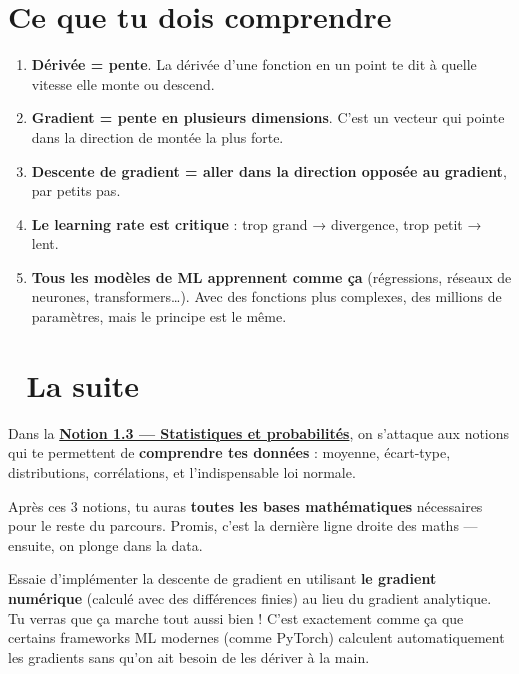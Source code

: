 \documentclass[
  french,
  11pt,
  a4paper,
]{scrbook}
\providecommand{\tightlist}{%
  \setlength{\itemsep}{0pt}\setlength{\parskip}{0pt}}
\begin{document}
\section{Ce que tu dois comprendre}\label{ce-que-tu-dois-comprendre-1}

\begin{enumerate}
\def\labelenumi{\arabic{enumi}.}
\tightlist
\item
  \textbf{Dérivée = pente}. La dérivée d'une fonction en un point te dit
  à quelle vitesse elle monte ou descend.
\item
  \textbf{Gradient = pente en plusieurs dimensions}. C'est un vecteur
  qui pointe dans la direction de montée la plus forte.
\item
  \textbf{Descente de gradient = aller dans la direction opposée au
  gradient}, par petits pas.
\item
  \textbf{Le learning rate est critique} : trop grand → divergence, trop
  petit → lent.
\item
  \textbf{Tous les modèles de ML apprennent comme ça} (régressions,
  réseaux de neurones, transformers\ldots). Avec des fonctions plus
  complexes, des millions de paramètres, mais le principe est le même.
\end{enumerate}

\section{🚀 La suite}\label{la-suite-1}

Dans la \hyperref[]{\textbf{Notion 1.3 --- Statistiques et
probabilités}}, on s'attaque aux notions qui te permettent de
\textbf{comprendre tes données} : moyenne, écart-type, distributions,
corrélations, et l'indispensable loi normale.

Après ces 3 notions, tu auras \textbf{toutes les bases mathématiques}
nécessaires pour le reste du parcours. Promis, c'est la dernière ligne
droite des maths --- ensuite, on plonge dans la data.

\begin{tcolorbox}[enhanced jigsaw, arc=.35mm, bottomrule=.15mm, bottomtitle=1mm, breakable, colback=white, colbacktitle=quarto-callout-tip-color!10!white, colframe=quarto-callout-tip-color-frame, coltitle=black, left=2mm, leftrule=.75mm, opacityback=0, opacitybacktitle=0.6, rightrule=.15mm, title=\textcolor{quarto-callout-tip-color}{\faLightbulb}\hspace{0.5em}{💡 Petit défi pour la route}, titlerule=0mm, toprule=.15mm, toptitle=1mm]

Essaie d'implémenter la descente de gradient en utilisant \textbf{le
gradient numérique} (calculé avec des différences finies) au lieu du
gradient analytique. Tu verras que ça marche tout aussi bien ! C'est
exactement comme ça que certains frameworks ML modernes (comme PyTorch)
calculent automatiquement les gradients sans qu'on ait besoin de les
dériver à la main.

\end{tcolorbox}
\end{document}
